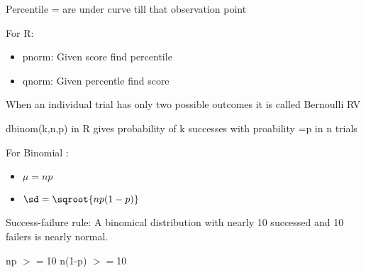 \documentclass[a4paper]{article}
\begin{document}
Percentile = are under curve till that observation point

For R:
 \begin{itemize}
 \item pnorm: Given score find percentile
 \item qnorm: Given percentle find score
 
  \end{itemize}
 
 
 When an individual trial has only two possible outcomes it is called
 Bernoulli RV
 
 dbinom(k,n,p) in R gives probability of k successes with proability =p in n  trials
 
 For Binomial :
 \begin{itemize}
 \item $\mu=np$
 \item $\sd=\sqroot{np(1-p)}$
 \end{itemize}
 
 Success-failure rule: A binomical distribution with nearly 10 successed and 10 failers is nearly normal.
 
 np $>=$10
 n(1-p) $>=$10
\end{document}
